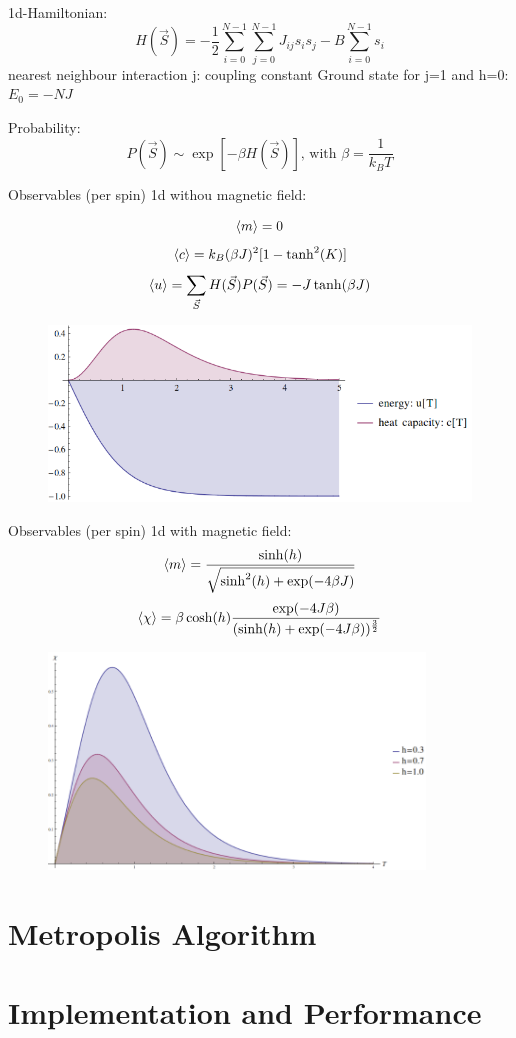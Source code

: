 \documentclass[12pt,a4paper,titlepage]{article}
\begin{document}
1d-Hamiltonian: \[H(\vec{S})= - \frac{1}{2}\sum_{i=0}^{N-1} \sum_{j=0}^{N-1} J_{ij} s_i s_j - B \sum_{i=0}^{N-1}s_i \]
nearest neighbour interaction
j: coupling constant
Ground state for j=1 and h=0: $E_0=-NJ$\newline

Probability: \[P(\vec{S}) \sim \exp[-\beta H(\vec{S})]\text{, with } \beta = \frac{1}{k_B T}\]




Observables (per spin) 1d withou magnetic field:

$$\braket{m} = 0$$\newline
$$\braket{c} = k_B(\beta J)^2[1-\tanh^2(K)]$$\newline
$$\braket{u} = \sum_{\vec{S}}H(\vec{S})P(\vec{S}) = -J \tanh(\beta J)$$\newline



\begin{figure}[h]
	\includegraphics[width=\linewidth]{Plots/spin1d}
\end{figure}


Observables (per spin) 1d with magnetic field:
\[\braket{m} = \frac{\sinh(h)}{\sqrt{\sinh^2(h) + \exp(-4\beta J) }}\]
\[\braket{\chi}=\beta \cosh(h) \frac{\exp(-4J\beta)}{(\sinh(h)+\exp(-4J\beta))^{\frac{3}{2}}}\]


\begin{figure}[h]
	\includegraphics[width=10cm]{Plots/spin1dh}
\end{figure}




\newpage
\section{Metropolis Algorithm}
\newpage
\section{Implementation and Performance}
\end{document}
